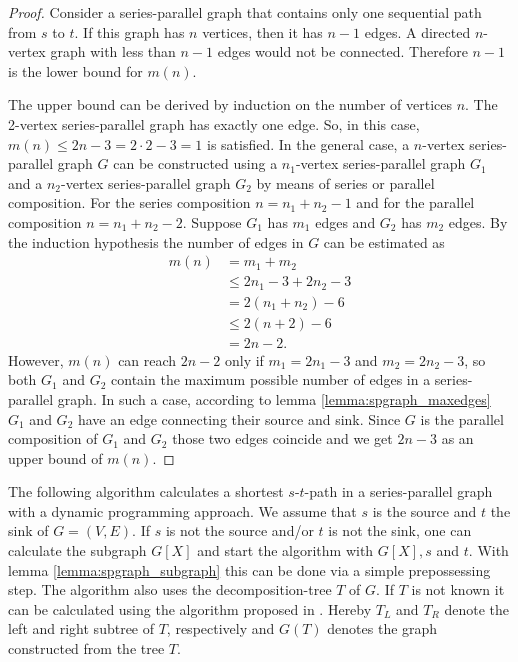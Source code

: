 \documentclass[]{article}
\numberwithin{equation}{section}
\begin{document}
\begin{proof}
	Consider a series-parallel graph that contains only one sequential path from $s$ to $t$. If this graph has $n$ vertices, then it has $n-1$ edges. A directed $n$-vertex graph with less than $n-1$ edges would not be connected. Therefore $n-1$ is the lower bound for $m(n)$.
	
	The upper bound can be derived by induction on the number of vertices $n$. The 2-vertex series-parallel graph has exactly one edge. So, in this case, $m(n)\leq2n-3=2\cdot2-3=1$ is satisfied. In the general case, a $n$-vertex series-parallel graph $G$ can be constructed using a $n_1$-vertex series-parallel graph $G_1$ and a $n_2$-vertex series-parallel graph $G_2$ by means of series or parallel composition. For the series composition $n = n_1+n_2-1$ and for the parallel composition $n = n_1+n_2-2$. Suppose $G_1$ has $m_1$ edges and $G_2$ has $m_2$ edges. By the induction hypothesis the number of edges in $G$ can be estimated as
	\begin{align*}
	m(n)&=m_1+m_2\\
	&\leq 2n_1-3+2n_2-3\\
	&=2(n_1+n_2)-6\\
	&\leq 2(n+2)-6\\
	&=2n-2.
	\end{align*}
	However, $m(n)$ can reach $2n-2$ only if $m_1=2n_1-3$ and $m_2=2n_2-3$, so both $G_1$ and $G_2$ contain the maximum possible number of edges in a series-parallel graph. In such a case, according to lemma \ref{lemma:spgraph_maxedges} $G_1$ and $G_2$ have an edge connecting their source and sink. Since $G$ is the parallel composition of $G_1$ and $G_2$ those two edges coincide and we get $2n-3$ as an upper bound of $m(n)$.
\end{proof}

The following algorithm calculates a shortest $s$-$t$-path in a series-parallel graph with a dynamic programming approach. We assume that $s$ is the source and $t$ the sink of $G=(V,E)$. If $s$ is not the source and/or $t$ is not the sink, one can calculate the subgraph $G[X]$ and start the algorithm with $G[X], s$ and $t$. With lemma \ref{lemma:spgraph_subgraph} this can be done via a simple prepossessing step. The algorithm also uses the decomposition-tree $T$ of $G$. If $T$ is not known it can be calculated using the algorithm proposed in \cite{HY87}. Hereby $T_L$ and $T_R$ denote the left and right subtree of $T$, respectively and $G(T)$ denotes the graph constructed from the tree $T$.\\
\end{document}
